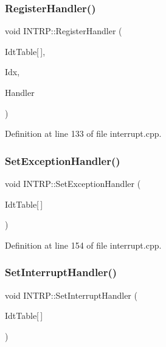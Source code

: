 \mbox{\label{namespace_i_n_t_r_p_a91a6a2668bfa9961a9ed265f6ceac47d}} 
\subsubsection{\texorpdfstring{Register\+Handler()}{RegisterHandler()}}
{\footnotesize\ttfamily void I\+N\+T\+R\+P\+::\+Register\+Handler (\begin{DoxyParamCaption}\item[{Descriptor\+Entry}]{Idt\+Table\mbox{[}$\,$\mbox{]},  }\item[{size\+\_\+t}]{Idx,  }\item[{\hyperlink{ktypes_8h_a46bbb9e776183ed6a8eca9d919756434}{func\+\_\+ptr}}]{Handler }\end{DoxyParamCaption})}



Definition at line 133 of file interrupt.\+cpp.

\mbox{\label{namespace_i_n_t_r_p_a4a1a1ff73a4e9bb1c17daf205170daa9}} 
\subsubsection{\texorpdfstring{Set\+Exception\+Handler()}{SetExceptionHandler()}}
{\footnotesize\ttfamily void I\+N\+T\+R\+P\+::\+Set\+Exception\+Handler (\begin{DoxyParamCaption}\item[{Descriptor\+Entry}]{Idt\+Table\mbox{[}$\,$\mbox{]} }\end{DoxyParamCaption})}



Definition at line 154 of file interrupt.\+cpp.

\mbox{\label{namespace_i_n_t_r_p_abf09ee877603981fe255cd050cbbb110}} 
\subsubsection{\texorpdfstring{Set\+Interrupt\+Handler()}{SetInterruptHandler()}}
{\footnotesize\ttfamily void I\+N\+T\+R\+P\+::\+Set\+Interrupt\+Handler (\begin{DoxyParamCaption}\item[{Descriptor\+Entry}]{Idt\+Table\mbox{[}$\,$\mbox{]} }\end{DoxyParamCaption})}



